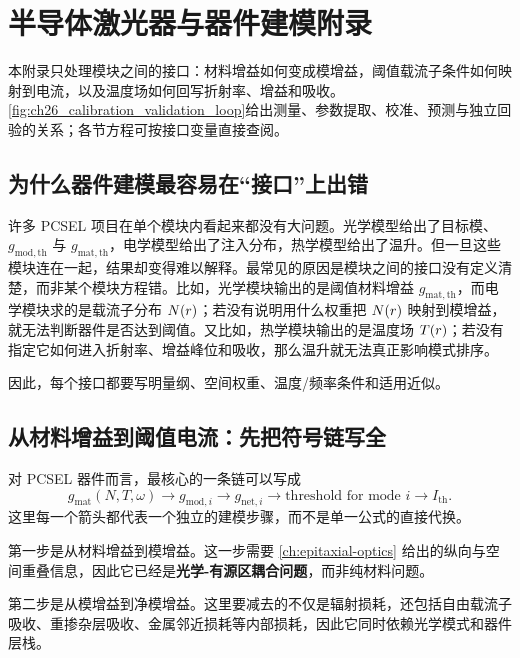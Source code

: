 ﻿%
\chapter{半导体激光器与器件建模附录}
\label{ch:device-appendix}


本附录只处理模块之间的接口：材料增益如何变成模增益，阈值载流子条件如何映射到电流，以及温度场如何回写折射率、增益和吸收。\cref{fig:ch26_calibration_validation_loop}给出测量、参数提取、校准、预测与独立回验的关系；各节方程可按接口变量直接查阅。

\section{为什么器件建模最容易在“接口”上出错}
许多 PCSEL 项目在单个模块内看起来都没有大问题。光学模型给出了目标模、$g_{\mathrm{mod,th}}$ 与 $g_{\mathrm{mat,th}}$，电学模型给出了注入分布，热学模型给出了温升。但一旦这些模块连在一起，结果却变得难以解释。最常见的原因是模块之间的接口没有定义清楚，而非某个模块方程错。比如，光学模块输出的是阈值材料增益 $g_{\mathrm{mat,th}}$，而电学模块求的是载流子分布 $N(r)$；若没有说明用什么权重把 $N(r)$ 映射到模增益，就无法判断器件是否达到阈值。又比如，热学模块输出的是温度场 $T(r)$；若没有指定它如何进入折射率、增益峰位和吸收，那么温升就无法真正影响模式排序。

因此，每个接口都要写明量纲、空间权重、温度/频率条件和适用近似。

\section{从材料增益到阈值电流：先把符号链写全}
对 PCSEL 器件而言，最核心的一条链可以写成
\begin{equation}
g_{\mathrm{mat}}(N,T,\omega)
\longrightarrow
g_{\mathrm{mod},i}
\longrightarrow
g_{\mathrm{net},i}
\longrightarrow
\text{threshold for mode } i
\longrightarrow
I_{\mathrm{th}}.
\label{eq:device_chain_appendix}
\end{equation}
这里每一个箭头都代表一个独立的建模步骤，而不是单一公式的直接代换。

第一步是从材料增益到模增益。这一步需要 \cref{ch:epitaxial-optics} 给出的纵向与空间重叠信息，因此它已经是\textbf{光学-有源区耦合问题}，而非纯材料问题。

第二步是从模增益到净模增益。这里要减去的不仅是辐射损耗，还包括自由载流子吸收、重掺杂层吸收、金属邻近损耗等内部损耗，因此它同时依赖光学模式和器件层栈。

